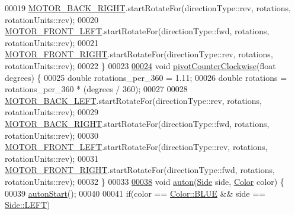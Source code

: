 \begin{DoxyCode}
00019   \mbox{\hyperlink{declarations_8h_adece81dedf91c2893ba42dc05135a575_adece81dedf91c2893ba42dc05135a575}{MOTOR\_BACK\_RIGHT}}.startRotateFor(directionType::rev, rotations, rotationUnits::rev);
00020   \mbox{\hyperlink{declarations_8h_a8c6f6315caf1d81bf4d4d113d0f7bffc_a8c6f6315caf1d81bf4d4d113d0f7bffc}{MOTOR\_FRONT\_LEFT}}.startRotateFor(directionType::fwd, rotations, rotationUnits::rev);
00021   \mbox{\hyperlink{declarations_8h_ad6a9ea3d338421c5d709c32ae1aa42d8_ad6a9ea3d338421c5d709c32ae1aa42d8}{MOTOR\_FRONT\_RIGHT}}.startRotateFor(directionType::rev, rotations, rotationUnits::rev);
00022 \}
00023 
\mbox{\hyperlink{auton_8cpp_a962e4ac8747da1eb2aba6615d62e953b_a962e4ac8747da1eb2aba6615d62e953b}{00024}} \textcolor{keywordtype}{void} \mbox{\hyperlink{auton_8cpp_a962e4ac8747da1eb2aba6615d62e953b_a962e4ac8747da1eb2aba6615d62e953b}{pivotCounterClockwise}}(\textcolor{keywordtype}{float} degrees) \{
00025   \textcolor{keywordtype}{double} rotations\_per\_360 = 1.11;
00026   \textcolor{keywordtype}{double} rotations = rotations\_per\_360 * (degrees / 360);
00027 
00028   \mbox{\hyperlink{declarations_8h_ab24214b642128d0f3cb67e9b12e7d4fb_ab24214b642128d0f3cb67e9b12e7d4fb}{MOTOR\_BACK\_LEFT}}.startRotateFor(directionType::rev, rotations, rotationUnits::rev);
00029   \mbox{\hyperlink{declarations_8h_adece81dedf91c2893ba42dc05135a575_adece81dedf91c2893ba42dc05135a575}{MOTOR\_BACK\_RIGHT}}.startRotateFor(directionType::fwd, rotations, rotationUnits::rev);
00030   \mbox{\hyperlink{declarations_8h_a8c6f6315caf1d81bf4d4d113d0f7bffc_a8c6f6315caf1d81bf4d4d113d0f7bffc}{MOTOR\_FRONT\_LEFT}}.startRotateFor(directionType::rev, rotations, rotationUnits::rev);
00031   \mbox{\hyperlink{declarations_8h_ad6a9ea3d338421c5d709c32ae1aa42d8_ad6a9ea3d338421c5d709c32ae1aa42d8}{MOTOR\_FRONT\_RIGHT}}.startRotateFor(directionType::fwd, rotations, rotationUnits::rev);
00032 \}
00033 
\mbox{\hyperlink{auton_8cpp_a9c7e58a3b4bb5cdd30a6b3ed32e8f962_a9c7e58a3b4bb5cdd30a6b3ed32e8f962}{00038}} \textcolor{keywordtype}{void} \mbox{\hyperlink{auton_8cpp_a9c7e58a3b4bb5cdd30a6b3ed32e8f962_a9c7e58a3b4bb5cdd30a6b3ed32e8f962}{auton}}(\mbox{\hyperlink{auton_8h_a702107095bd059695d57318e7338a4a7_a702107095bd059695d57318e7338a4a7}{Side}} side, \mbox{\hyperlink{auton_8h_a78abb31bad0fd1834c54a3ca6f8daab5_a78abb31bad0fd1834c54a3ca6f8daab5}{Color}} color) \{
00039   \mbox{\hyperlink{auton_8cpp_a1a25993901b668e4c162eb31fa463b52_a1a25993901b668e4c162eb31fa463b52}{autonStart}}();
00040 
00041   \textcolor{keywordflow}{if}(color == \mbox{\hyperlink{auton_8h_a78abb31bad0fd1834c54a3ca6f8daab5_a78abb31bad0fd1834c54a3ca6f8daab5a1b3e1ee9bff86431dea6b181365ba65f}{Color::BLUE}} && side == \mbox{\hyperlink{auton_8h_a702107095bd059695d57318e7338a4a7_a702107095bd059695d57318e7338a4a7a684d325a7303f52e64011467ff5c5758}{Side::LEFT}})

\end{DoxyCode}
